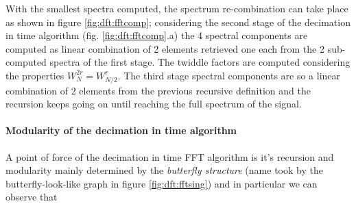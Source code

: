 		With the smallest spectra computed, the spectrum re-combination can take place as shown in figure \ref{fig:dft:fftcomp}; considering the second stage of the decimation in time algorithm (fig. \ref{fig:dft:fftcomp}.a) the 4 spectral components are computed as linear combination of 2 elements retrieved one each from the 2 sub-computed spectra of the first stage. The twiddle factors are computed considering the properties $W_N^{2r} = W^r_{N/2}$. The third stage spectral components are so a linear combination of 2 elements from the previous  recursive definition and the recursion keeps going on until reaching the full spectrum of the signal.	 	
		
		\paragraph{Modularity of the decimation in time algorithm} A point of force of the decimation in time FFT algorithm is it's recursion and modularity mainly determined by the \textit{butterfly structure} (name took by the butterfly-look-like graph in figure \ref{fig:dft:fftsing}) and in particular we can observe that
